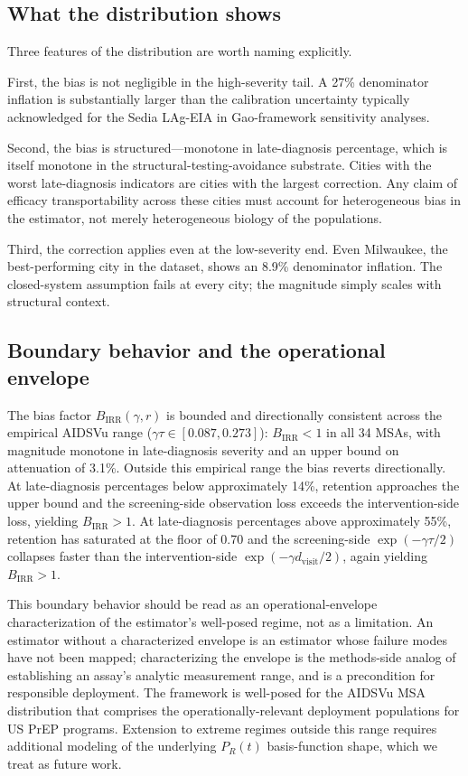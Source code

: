 \documentclass[12pt]{article}
\begin{document}
\subsection{What the distribution shows}

Three features of the distribution are worth naming explicitly.

First, the bias is not negligible in the high-severity tail. A 27\% denominator inflation is substantially larger than the calibration uncertainty typically acknowledged for the Sedia LAg-EIA in Gao-framework sensitivity analyses.

Second, the bias is structured---monotone in late-diagnosis percentage, which is itself monotone in the structural-testing-avoidance substrate. Cities with the worst late-diagnosis indicators are cities with the largest correction. Any claim of efficacy transportability across these cities must account for heterogeneous bias in the estimator, not merely heterogeneous biology of the populations.

Third, the correction applies even at the low-severity end. Even Milwaukee, the best-performing city in the dataset, shows an 8.9\% denominator inflation. The closed-system assumption fails at every city; the magnitude simply scales with structural context.

\subsection{Boundary behavior and the operational envelope}

The bias factor $B_{\mathrm{IRR}}(\gamma, r)$ is bounded and directionally consistent across the empirical AIDSVu range ($\gamma\tau \in [0.087, 0.273]$): $B_{\mathrm{IRR}} < 1$ in all 34 MSAs, with magnitude monotone in late-diagnosis severity and an upper bound on attenuation of 3.1\%. Outside this empirical range the bias reverts directionally. At late-diagnosis percentages below approximately 14\%, retention approaches the upper bound and the screening-side observation loss exceeds the intervention-side loss, yielding $B_{\mathrm{IRR}} > 1$. At late-diagnosis percentages above approximately 55\%, retention has saturated at the floor of 0.70 and the screening-side $\exp(-\gamma\tau/2)$ collapses faster than the intervention-side $\exp(-\gamma d_{\mathrm{visit}}/2)$, again yielding $B_{\mathrm{IRR}} > 1$.

This boundary behavior should be read as an operational-envelope characterization of the estimator's well-posed regime, not as a limitation. An estimator without a characterized envelope is an estimator whose failure modes have not been mapped; characterizing the envelope is the methods-side analog of establishing an assay's analytic measurement range, and is a precondition for responsible deployment. The framework is well-posed for the AIDSVu MSA distribution that comprises the operationally-relevant deployment populations for US PrEP programs. Extension to extreme regimes outside this range requires additional modeling of the underlying $P_R(t)$ basis-function shape, which we treat as future work.
\end{document}
